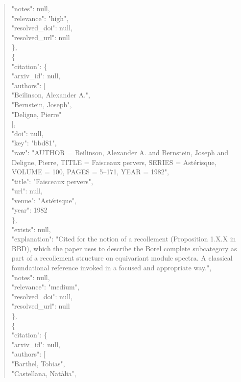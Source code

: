 \documentclass[11pt]{article}
\begin{document}
\begin{quote}
      "notes": null,\\
      "relevance": "high",\\
      "resolved\_doi": null,\\
      "resolved\_url": null\\
    \},\\
    \{\\
      "citation": \{\\
        "arxiv\_id": null,\\
        "authors": [\\
          "Beilinson, Alexander A.",\\
          "Bernstein, Joseph",\\
          "Deligne, Pierre"\\
        ],\\
        "doi": null,\\
        "key": "bbd81",\\
        "raw": "AUTHOR = Beilinson, Alexander A. and Bernstein, Joseph and Deligne, Pierre, TITLE = Faisceaux pervers, SERIES = Astérisque, VOLUME = 100, PAGES = 5--171, YEAR = 1982",\\
        "title": "Faisceaux pervers",\\
        "url": null,\\
        "venue": "Astérisque",\\
        "year": 1982\\
      \},\\
      "exists": null,\\
      "explanation": "Cited for the notion of a recollement (Proposition 1.X.X in BBD), which the paper uses to describe the Borel complete subcategory as part of a recollement structure on equivariant module spectra. A classical foundational reference invoked in a focused and appropriate way.",\\
      "notes": null,\\
      "relevance": "medium",\\
      "resolved\_doi": null,\\
      "resolved\_url": null\\
    \},\\
    \{\\
      "citation": \{\\
        "arxiv\_id": null,\\
        "authors": [\\
          "Barthel, Tobias",\\
          "Castellana, Natàlia",\\

\end{quote}
\end{document}
